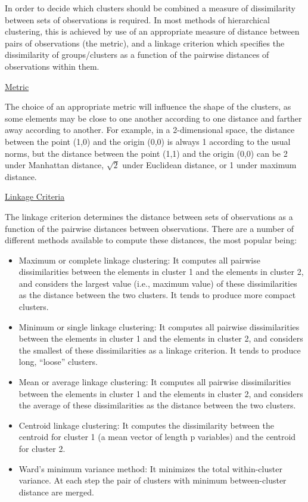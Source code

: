 
In order to decide which clusters should be combined a measure of dissimilarity between sets of observations is required. In most methods of hierarchical clustering, this is achieved by use of an appropriate measure of distance between pairs of observations (the metric), and a linkage criterion which specifies the dissimilarity of groups/clusters as a function of the pairwise distances of observations within them.

\underline{Metric}

The choice of an appropriate metric will influence the shape of the clusters, as some elements may be close to one another according to one distance and farther away according to another. For example, in a 2-dimensional space, the distance between the point (1,0) and the origin (0,0) is always 1 according to the usual norms, but the distance between the point (1,1) and the origin (0,0) can be 2 under Manhattan distance, $\sqrt{2}$ under Euclidean distance, or 1 under maximum distance.

\underline{Linkage Criteria}

The linkage criterion determines the distance between sets of observations as a function of the pairwise distances between observations. There are a number of different methods available to compute these distances, the most popular being: 

\begin{itemize}
    \item Maximum or complete linkage clustering: It computes all pairwise dissimilarities between the elements in cluster 1 and the elements in cluster 2, and considers the largest value (i.e., maximum value) of these dissimilarities as the distance between the two clusters. It tends to produce more compact clusters.
    \item Minimum or single linkage clustering: It computes all pairwise dissimilarities between the elements in cluster 1 and the elements in cluster 2, and considers the smallest of these dissimilarities as a linkage criterion. It tends to produce long, “loose” clusters.
    \item Mean or average linkage clustering: It computes all pairwise dissimilarities between the elements in cluster 1 and the elements in cluster 2, and considers the average of these dissimilarities as the distance between the two clusters. 
    \item Centroid linkage clustering: It computes the dissimilarity between the centroid for cluster 1 (a mean vector of length p variables) and the centroid for cluster 2.
    \item Ward’s minimum variance method: It minimizes the total within-cluster variance. At each step the pair of clusters with minimum between-cluster distance are merged.
\end{itemize}

